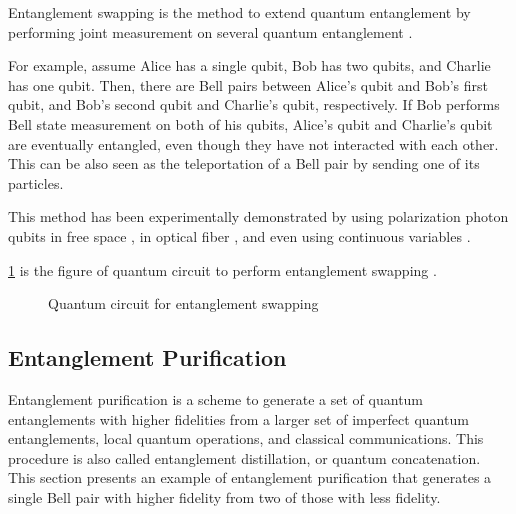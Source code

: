 Entanglement swapping is the method to extend quantum entanglement by performing joint measurement on several quantum entanglement \cite{zukowski1993event}.

For example, assume Alice has a single qubit, Bob has two qubits, and Charlie has one qubit. Then, there are Bell pairs between Alice's qubit and Bob's first qubit, and Bob's second qubit and Charlie's qubit, respectively.
If Bob performs Bell state measurement on both of his qubits, Alice's qubit and Charlie's qubit are eventually entangled, even though they have not interacted with each other.
This can be also seen as the teleportation of a Bell pair by sending one of its particles. 

This method has been experimentally demonstrated by using polarization photon qubits in free space \cite{PhysRevLett.80.3891}, in optical fiber \cite{PhysRevA.71.050302}, and even using continuous variables \cite{jia2004experimental}.

\ref{background:entanglement-swapping} is the figure of quantum circuit to perform entanglement swapping \cite{9803043}.

\begin{figure}[ht]
  \begin{center}
\caption{Quantum circuit for entanglement swapping}
\end{center}
\label{background:entanglement-swapping}
\end{figure}

\subsection{Entanglement Purification}

Entanglement purification \cite{PhysRevA.53.2046} is a scheme to generate a set of quantum entanglements with higher fidelities from a larger set of imperfect quantum entanglements, local quantum operations, and classical communications.
This procedure is also called entanglement distillation, or quantum concatenation. This section presents an example of entanglement purification that generates a single Bell pair with higher fidelity from two of those with less fidelity.

